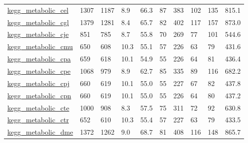 \begin{longtable}{llllllllll}
 \href{http://santafe.edu/~aaronc/data/kegg2006_metabolic.zip}{kegg\_metabolic\_cel}                                          & 1307       & 1187  & 8.9    & 66.3   & 87    & 383    & 102    & 135    & 815.1   \\
 \href{http://santafe.edu/~aaronc/data/kegg2006_metabolic.zip}{kegg\_metabolic\_cgl}                                          & 1379       & 1281  & 8.4    & 65.7   & 82    & 402    & 117    & 157    & 873.0   \\
 \href{http://santafe.edu/~aaronc/data/kegg2006_metabolic.zip}{kegg\_metabolic\_cje}                                          & 851        & 785   & 8.7    & 55.8   & 70    & 269    & 77     & 101    & 544.6   \\
 \href{http://santafe.edu/~aaronc/data/kegg2006_metabolic.zip}{kegg\_metabolic\_cmu}                                          & 650        & 608   & 10.3   & 55.1   & 57    & 226    & 63     & 79     & 431.6   \\
 \href{http://santafe.edu/~aaronc/data/kegg2006_metabolic.zip}{kegg\_metabolic\_cpa}                                          & 659        & 618   & 10.1   & 54.9   & 55    & 226    & 64     & 81     & 436.4   \\
 \href{http://santafe.edu/~aaronc/data/kegg2006_metabolic.zip}{kegg\_metabolic\_cpe}                                          & 1068       & 979   & 8.9    & 62.7   & 85    & 335    & 89     & 116    & 682.2   \\
 \href{http://santafe.edu/~aaronc/data/kegg2006_metabolic.zip}{kegg\_metabolic\_cpj}                                          & 660        & 619   & 10.1   & 55.0   & 55    & 227    & 67     & 82     & 437.8   \\
 \href{http://santafe.edu/~aaronc/data/kegg2006_metabolic.zip}{kegg\_metabolic\_cpn}                                          & 660        & 619   & 10.1   & 55.0   & 55    & 226    & 64     & 80     & 437.2   \\
 \href{http://santafe.edu/~aaronc/data/kegg2006_metabolic.zip}{kegg\_metabolic\_cte}                                          & 1000       & 908   & 8.3    & 57.5   & 75    & 311    & 72     & 92     & 630.8   \\
 \href{http://santafe.edu/~aaronc/data/kegg2006_metabolic.zip}{kegg\_metabolic\_ctr}                                          & 652        & 610   & 10.3   & 55.4   & 57    & 227    & 63     & 79     & 433.5   \\
 \href{http://santafe.edu/~aaronc/data/kegg2006_metabolic.zip}{kegg\_metabolic\_dme}                                          & 1372       & 1262  & 9.0    & 68.7   & 81    & 408    & 116    & 148    & 865.7   \\

\end{longtable}
